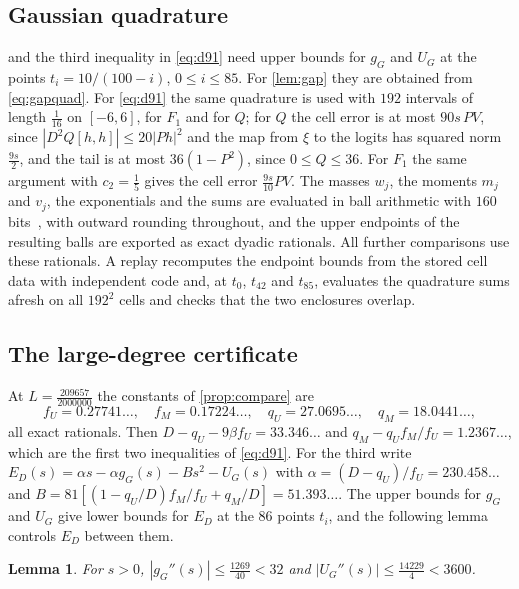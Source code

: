 \documentclass[11pt]{amsart}
\newtheorem{lemma}[theorem]{Lemma}
\theoremstyle{definition}
\theoremstyle{remark}
\begin{document}
\subsection{Gaussian quadrature}
 and the third inequality in \eqref{eq:d91} need upper bounds for $g_G$ and $U_G$ at the points
$t_i=10/(100-i)$, $0\le i\le85$. For \cref{lem:gap} they are obtained from \eqref{eq:gapquad}. For \eqref{eq:d91}
the same quadrature is used with $192$ intervals of length $\tfrac1{16}$ on $[-6,6]$, for $F_1$ and for $Q$; for $Q$ the cell error is at most $90s\,PV$, since $|D^2Q[h,h]|\le20|Ph|^2$ and the map from $\xi$ to the
logits has squared norm $\tfrac{9s}2$, and the tail is at most $36(1-P^2)$, since $0\le Q\le36$. For $F_1$ the
same argument with $c_2=\tfrac15$ gives the cell error $\tfrac{9s}{10}PV$. The masses $w_j$, the moments $m_j$
and $v_j$, the exponentials and the sums are evaluated in ball arithmetic with $160$ bits~\cite{Joh17}, with
outward rounding throughout, and the upper endpoints of the resulting balls are exported as exact dyadic
rationals. All further comparisons use these rationals. A replay recomputes the endpoint bounds from the stored
cell data with independent code and, at $t_0$, $t_{42}$ and $t_{85}$, evaluates the quadrature sums afresh on all
$192^2$ cells and checks that the two enclosures overlap.

\subsection{The large-degree certificate}
At $L=\tfrac{209657}{2000000}$ the constants of \cref{prop:compare} are
\[
f_U=0.27741\ldots,\quad f_M=0.17224\ldots,\quad q_U=27.0695\ldots,\quad q_M=18.0441\ldots,
\]
all exact rationals. Then $D-q_U-9\beta f_U=33.346\ldots$ and $q_M-q_Uf_M/f_U=1.2367\ldots$, which are the first
two inequalities of \eqref{eq:d91}. For the third write
$E_D(s)=\alpha s-\alpha g_G(s)-Bs^2-U_G(s)$ with $\alpha=(D-q_U)/f_U=230.458\ldots$ and
$B=81[(1-q_U/D)f_M/f_U+q_M/D]=51.393\ldots$. The upper bounds for $g_G$ and $U_G$ give lower bounds for $E_D$ at
the $86$ points $t_i$, and the following lemma controls $E_D$ between them.

\begin{lemma}\label{lem:curv}
For $s>0$, $|g_G''(s)|\le\tfrac{1269}{40}<32$ and $|U_G''(s)|\le\tfrac{14229}4<3600$.
\end{lemma}
\end{document}
